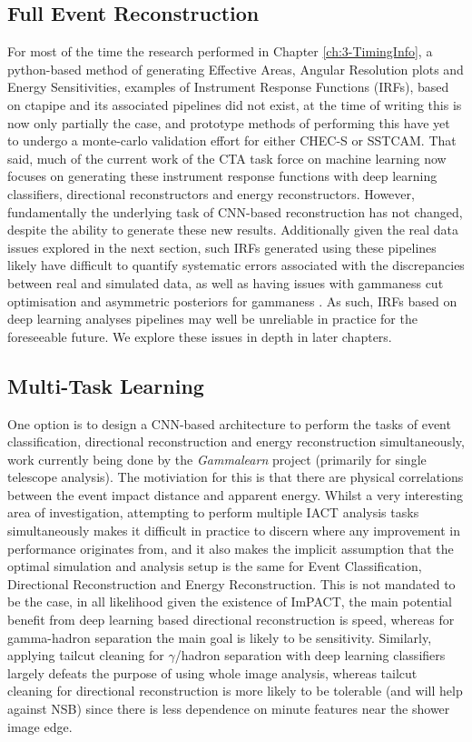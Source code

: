 \subsection{Full Event Reconstruction}
For most of the time the research performed in Chapter \ref{ch:3-TimingInfo}, a python-based method of generating Effective Areas, Angular Resolution plots and Energy Sensitivities, examples of Instrument Response Functions (IRFs), based on ctapipe and its associated pipelines did not exist, at the time of writing this is now only partially the case, and prototype methods of performing this have yet to undergo a monte-carlo validation effort for either CHEC-S or SSTCAM. That said, much of the current work of the CTA task force on machine learning now focuses on generating these instrument response functions with deep learning classifiers, directional reconstructors and energy reconstructors. However, fundamentally the underlying task of CNN-based reconstruction has not changed, despite the ability to generate these new results. Additionally given the real data issues explored in the next section, such IRFs generated using these pipelines likely have difficult to quantify systematic errors associated with the discrepancies between real and simulated data, as well as having issues with gammaness cut optimisation and asymmetric posteriors for gammaness \cite{mike}. As such, IRFs based on deep learning analyses pipelines may well be unreliable in practice for the foreseeable future. We explore these issues in depth in later chapters.

\subsection{Multi-Task Learning}

One option is to design a CNN-based architecture to perform the tasks of event classification, directional reconstruction and energy reconstruction simultaneously, work currently being done by the \textit{Gammalearn} project \cite{mikaelphd} (primarily for single telescope analysis). The motiviation for this is that there are physical correlations between the event impact distance and apparent energy. Whilst a very interesting area of investigation, attempting to perform multiple IACT analysis tasks simultaneously makes it difficult in practice to discern where any improvement in performance originates from, and it also makes the implicit assumption that the optimal simulation and analysis setup is the same for Event Classification, Directional Reconstruction and Energy Reconstruction. This is not mandated to be the case, in all likelihood given the existence of ImPACT, the main potential benefit from deep learning based directional reconstruction is speed, whereas for gamma-hadron separation the main goal is likely to be sensitivity. Similarly, applying tailcut cleaning for $\gamma$/hadron separation with deep learning classifiers largely defeats the purpose of using whole image analysis, whereas tailcut cleaning for directional reconstruction is more likely to be tolerable (and will help against NSB) since there is less dependence on minute features near the shower image edge.

